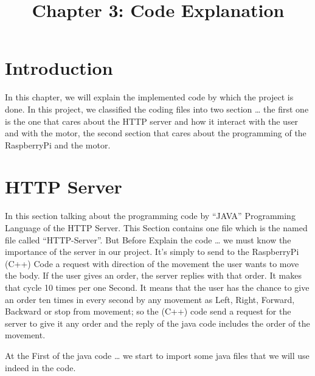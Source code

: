 \documentclass{article}
\title{Chapter 3: Code Explanation }
\author{ }
\begin{document}
\maketitle
\large
\section{Introduction}
In this chapter, we will explain the implemented code by which the project is done. In this project, we classified the coding files into two section … the first one is the one that cares about the HTTP server and how it interact with the user and with the motor, the second section that cares about the programming of the RaspberryPi and the motor.


\section{HTTP Server}

In this section talking about the programming code by “JAVA” Programming Language of the HTTP Server. This Section contains one file which is the named file called “HTTP-Server”. But Before Explain the code … we must know the importance of the server in our project. It’s simply to send to the RaspberryPi (C++) Code a request with direction of the movement the user wants to move the body. If the user gives an order, the server replies with that order. It makes that cycle 10 times per one Second. It means that the user has the chance to give an order ten times in every second by any movement as Left, Right, Forward, Backward or stop from movement; so the (C++) code send a request for the server to give it any order and the reply of the java code includes the order of the movement.


\newpage
At the First of the java code … we start to import some java files that we will use indeed in the code.
\end{document}
